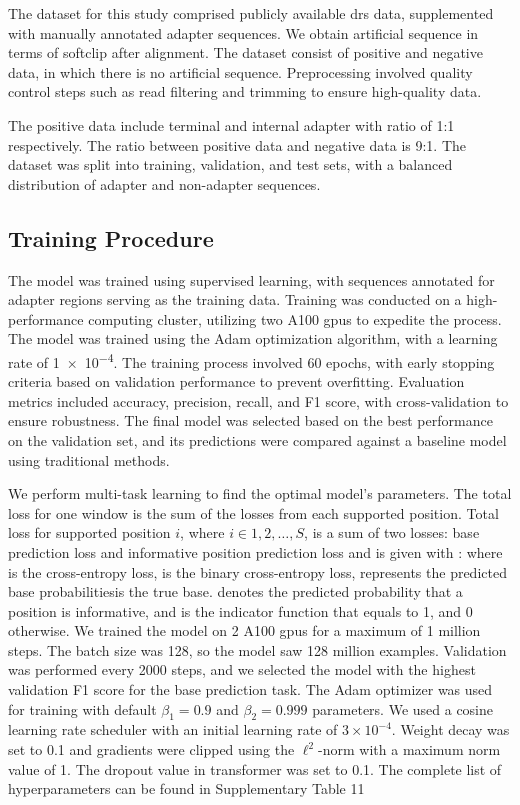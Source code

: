 \documentclass[pdflatex, sn-mathphys-num, lineno]{sn-jnl}%
\theoremstyle{thmstyleone}%
\theoremstyle{thmstyletwo}%
\theoremstyle{thmstylethree}%
\begin{document}
The dataset for this study comprised publicly available \gls{drs} data, supplemented with manually annotated adapter sequences.
We obtain artificial sequence in terms of softclip after alignment.
The dataset consist of positive and negative data, in which there is no artificial sequence.
Preprocessing involved quality control steps such as read filtering and trimming to ensure high-quality data.

The positive data include terminal and  internal adapter with ratio of 1:1 respectively.
The ratio between  positive data  and negative data is 9:1.
The dataset was split into training, validation, and test sets, with a balanced distribution of adapter and non-adapter sequences.

\subsection{Training Procedure}\label{ssec:training}

The model was trained using supervised learning, with sequences annotated for adapter regions serving as the training data.
Training was conducted on a high-performance computing cluster, utilizing two A100 \glspl{gpu} to expedite the process.
The model was trained using the Adam optimization algorithm, with a learning rate of \num{1e-4}.
The training process involved \num{60} epochs, with early stopping criteria based on validation performance to prevent overfitting.
Evaluation metrics included accuracy, precision, recall, and F1 score, with cross-validation to ensure robustness.
The final model was selected based on the best performance on the validation set, and its predictions were compared against a baseline model using traditional methods.

We perform multi-task learning to find the optimal model’s parameters.
The total loss for one window is the sum of the losses from each supported position.
Total loss for supported position  \( i \), where \( i  \in {1,2, \ldots, S} \), is a sum of two losses: base prediction loss and informative position prediction loss and is given with :
where is the cross-entropy loss,  is the binary cross-entropy loss, represents the predicted base probabilitiesis the true base.
denotes the predicted probability that a
position is informative, and is the indicator function that equals to 1, and 0 otherwise.
We trained the model on 2 A100 \glspl{gpu} for a maximum of 1 million steps.
The batch size was 128, so the model saw 128 million examples.
Validation was performed every 2000 steps, and we selected the model with the highest validation F1 score for the base prediction task.
The Adam optimizer was used for training with default \( \beta_{1} = 0.9 \) and \( \beta_{2} = 0.999 \) parameters.
We used a cosine learning rate scheduler with an initial learning rate of \( 3 \times 10^{-4} \).
Weight decay was set to 0.1 and gradients were clipped using the \( \ell^{2}\)-norm with a maximum norm value of 1.
The dropout value in transformer was set to \num{0.1}.
The complete list of hyperparameters can be found in Supplementary Table 11
\end{document}

